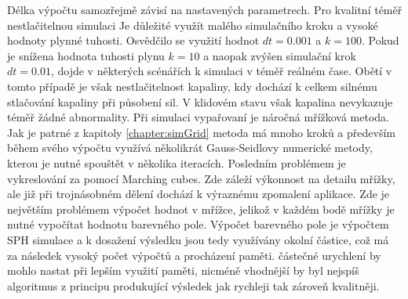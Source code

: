 Délka výpočtu samozřejmě závisí na nastavených parametrech. Pro kvalitní téměř nestlačitelnou simulaci Je důležité využít malého simulačního kroku a vysoké hodnoty plynné tuhosti. Osvědčilo se využití hodnot $dt=0.001$ a $k=100$. Pokud je snížena hodnota tuhosti plynu $k=10$ a naopak zvýšen simulační krok $dt=0.01$, dojde v některých scénářích k simulaci v téměř reálném čase. Obětí v tomto případě je však nestlačitelnost kapaliny, kdy dochází k celkem silnému stlačování kapaliny při působení sil. V klidovém stavu však kapalina nevykazuje téměř žádné abnormality. Při simulaci vypařovaní je náročná mřížková metoda. Jak je patrné z kapitoly \ref{chapter:simGrid} metoda má mnoho kroků a především během svého výpočtu využívá několikrát Gauss-Seidlovy numerické metody, kterou je nutné spouštět v několika iteracích. Posledním problémem je vykreslování za pomocí Marching cubes. Zde záleží výkonnost na detailu mřížky, ale již při trojnásobném dělení dochází k výraznému zpomalení aplikace. Zde je největším problémem výpočet hodnot v mřížce, jelikož v každém bodě mřížky je nutné vypočítat hodnotu barevného pole. Výpočet barevného pole je výpočtem SPH simulace a k dosažení výsledku jsou tedy využívány okolní částice, což má za následek vysoký počet výpočtů a procházení paměti. částečné urychlení by mohlo nastat při lepším využití paměti, nicméně vhodnější by byl nejspíš algoritmus z principu produkující výsledek jak rychleji tak zároveň kvalitněji.

